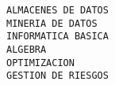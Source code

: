 \documentclass[11pt]{report}
\begin{document}
\begin{itemize}
\begin{verbatim}
ALMACENES DE DATOS                                                                                                                                                                                                                                                                                                                                                                                                                                                                                                  
MINERIA DE DATOS                                                                                                                                                                                                                                                                                                                                                                                                                                                                                                    
INFORMATICA BASICA                                                                                                                                                                                                                                                                                                                                                                                                                                                                                                  
ALGEBRA                                                                                                                                                                                                                                                                                                                                                                                                                                                                                                             
OPTIMIZACION                                                                                                                                                                                                                                                                                                                                                                                                                                                                                                        
GESTION DE RIESGOS                                                                                                                                                                                                                                                                                                                                                                                                                                                                                                  

\end{verbatim}
\end{itemize}
\end{document}

